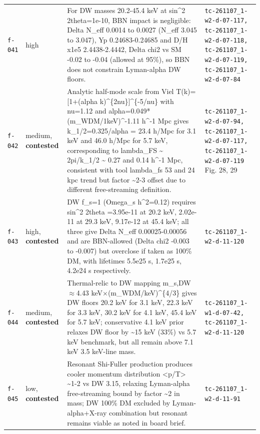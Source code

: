 \documentclass[11pt,a4paper]{article}
\begin{document}
\begin{longtable}{@{}p{}p{}p{}p{}@{}}
\texttt{f-041} & high & For DW masses 20.2-45.4 keV at sin\textasciicircum{}2 2theta=1e-10, BBN impact is negligible: Delta N\_eff 0.0014 to 0.0027 (N\_eff 3.045 to 3.047), Yp 0.24683-0.24685 and D/H x1e5 2.4438-2.4442, Delta chi2 vs SM -0.02 to -0.04 (allowed at 95\%), so BBN does not constrain Lyman-alpha DW floors. & \texttt{tc-261107\_\allowbreak{}1-w2-d-07-117,\allowbreak{} tc-261107\_\allowbreak{}1-w2-d-07-118,\allowbreak{} tc-261107\_\allowbreak{}1-w2-d-07-119,\allowbreak{} tc-261107\_\allowbreak{}1-w2-d-07-84} \\
\texttt{f-042} & medium, \textbf{contested} & Analytic half-mode scale from Viel T(k)=[1+(alpha k)\textasciicircum{}\{2nu\}]\textasciicircum{}\{-5/nu\} with nu=1.12 and alpha=0.049*(m\_WDM/1keV)\textasciicircum{}-1.11 h\textasciicircum{}-1 Mpc gives k\_1/2=0.325/alpha = 23.4 h/Mpc for 3.1 keV and 46.0 h/Mpc for 5.7 keV, corresponding to lambda\_FS \textasciitilde{} 2pi/k\_1/2 \textasciitilde{} 0.27 and 0.14 h\textasciicircum{}-1 Mpc, consistent with tool lambda\_fs 53 and 24 kpc trend but factor \textasciitilde{}2-3 offset due to different free-streaming definition. & \texttt{tc-261107\_\allowbreak{}1-w2-d-07-94,\allowbreak{} tc-261107\_\allowbreak{}1-w2-d-07-117,\allowbreak{} tc-261107\_\allowbreak{}1-w2-d-07-119} Fig. 28, 29 \\
\texttt{f-043} & high, \textbf{contested} & DW f\_s=1 (Omega\_s h\textasciicircum{}2=0.12) requires sin\textasciicircum{}2 2theta =3.95e-11 at 20.2 keV, 2.02e-11 at 29.3 keV, 9.17e-12 at 45.4 keV; all three give Delta N\_eff 0.00025-0.00056 and are BBN-allowed (Delta chi2 -0.003 to -0.007) but overclose if taken as 100\% DM, with lifetimes 5.5e25 s, 1.7e25 s, 4.2e24 s respectively. & \texttt{tc-261107\_\allowbreak{}1-w2-d-11-120} \\
\texttt{f-044} & medium, \textbf{contested} & Thermal-relic to DW mapping m\_s,DW $\approx$4.43 keV$\times$(m\_WDM/keV)\textasciicircum{}\{4/3\} gives DW floors 20.2 keV for 3.1 keV, 22.3 keV for 3.3 keV, 30.2 keV for 4.1 keV, 45.4 keV for 5.7 keV; conservative 4.1 keV prior relaxes DW floor by \textasciitilde{}15 keV (33\%) vs 5.7 keV benchmark, but all remain above 7.1 keV 3.5 keV-line mass. & \texttt{tc-261107\_\allowbreak{}1-w1-d-07-42,\allowbreak{} tc-261107\_\allowbreak{}1-w2-d-11-120} \\
\texttt{f-045} & low, \textbf{contested} & Resonant Shi-Fuller production produces cooler momentum distribution \textless{}p/T\textgreater{} \textasciitilde{}1-2 vs DW 3.15, relaxing Lyman-alpha free-streaming bound by factor \textasciitilde{}2 in mass; DW 100\% DM excluded by Lyman-alpha+X-ray combination but resonant remains viable as noted in board brief. & \texttt{tc-261107\_\allowbreak{}1-w2-d-11-91} \\

\end{longtable}
\end{document}
